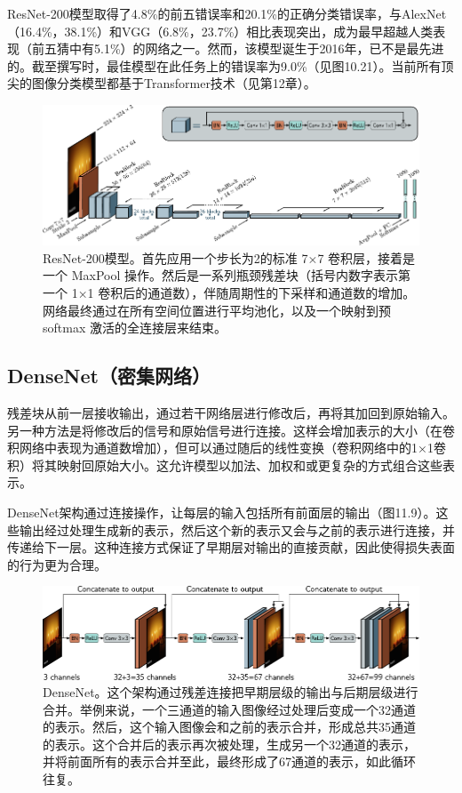 \documentclass[lang=cn,newtx,10pt,scheme=chinese]{elegantbook}
\begin{document}
ResNet-200模型取得了4.8\%的前五错误率和20.1\%的正确分类错误率，与AlexNet（16.4\%，38.1\%）和VGG（6.8\%，23.7\%）相比表现突出，成为最早超越人类表现（前五猜中有5.1\%）的网络之一。然而，该模型诞生于2016年，已不是最先进的。截至撰写时，最佳模型在此任务上的错误率为9.0\%（见图10.21）。当前所有顶尖的图像分类模型都基于Transformer技术（见第12章）。

\begin{figure}[ht!]
\centering
\includegraphics[width=0.7\linewidth]{PDFFigures/UDLChap11PDF/ResidualResnet2.pdf}
\caption{ResNet-200模型。首先应用一个步长为2的标准 7×7 卷积层，接着是一个 MaxPool 操作。然后是一系列瓶颈残差块（括号内数字表示第一个 1×1 卷积后的通道数），伴随周期性的下采样和通道数的增加。网络最终通过在所有空间位置进行平均池化，以及一个映射到预 softmax 激活的全连接层来结束。}
\end{figure}


\subsection{DenseNet（密集网络）}
残差块从前一层接收输出，通过若干网络层进行修改后，再将其加回到原始输入。另一种方法是将修改后的信号和原始信号进行连接。这样会增加表示的大小（在卷积网络中表现为通道数增加），但可以通过随后的线性变换（卷积网络中的1×1卷积）将其映射回原始大小。这允许模型以加法、加权和或更复杂的方式组合这些表示。

DenseNet架构通过连接操作，让每层的输入包括所有前面层的输出（图11.9）。这些输出经过处理生成新的表示，然后这个新的表示又会与之前的表示进行连接，并传递给下一层。这种连接方式保证了早期层对输出的直接贡献，因此使得损失表面的行为更为合理。

\begin{figure}[ht!]
\centering
\includegraphics[width=0.7\linewidth]{PDFFigures/UDLChap11PDF/ResidualDensenet.pdf}
\caption{DenseNet。这个架构通过残差连接把早期层级的输出与后期层级进行合并。举例来说，一个三通道的输入图像经过处理后变成一个32通道的表示。然后，这个输入图像会和之前的表示合并，形成总共35通道的表示。这个合并后的表示再次被处理，生成另一个32通道的表示，并将前面所有的表示合并至此，最终形成了67通道的表示，如此循环往复。}
\end{figure}
\end{document}
